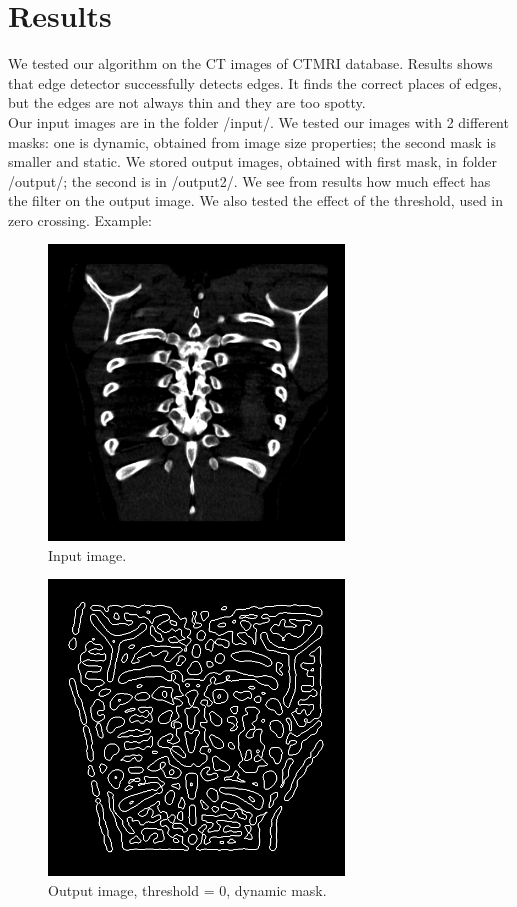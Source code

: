 \documentclass[a4paper,10pt]{article}
\begin{document}
\section{Results}
We tested our algorithm on the CT images of CTMRI database. Results shows that edge detector successfully detects edges. It finds the correct places of edges, but the edges are not always thin and they are too spotty.\\
Our input images are in the folder /input/. We tested our images with 2 different masks: one is dynamic, obtained from image size properties; the second mask is smaller and static. We stored output images, obtained with first mask, in folder /output/; the second is in /output2/. We see from results how much effect has the filter on the output image.
We also tested the effect of the threshold, used in zero crossing.
Example:
\begin{figure}[H]
  \caption{Input image.}
  \centering
    \includegraphics[width=0.7\textwidth]{0099.png}
\end{figure}

\begin{figure}[H]
  \caption{Output image, threshold = 0, dynamic mask.}
  \centering
    \includegraphics[width=0.7\textwidth]{out.png}
\end{figure}
\end{document}
